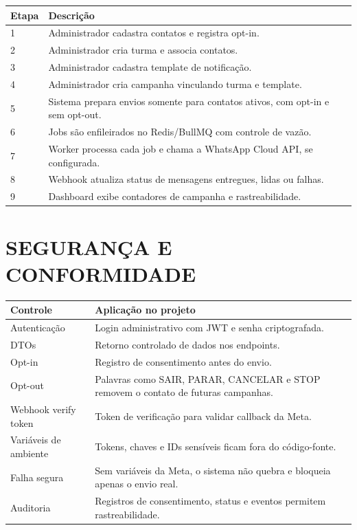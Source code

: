 \documentclass[12pt,letterpaper,oneside]{report}
\begin{document}
\begin{quadro}[H]
\centering
\caption{Fluxo técnico de campanha}
\vspace{0.3cm}
\begin{tabular}{|p{2cm}|p{11cm}|}
\hline
\textbf{Etapa} & \textbf{Descrição}\\
\hline
1 & Administrador cadastra contatos e registra opt-in.\\
\hline
2 & Administrador cria turma e associa contatos.\\
\hline
3 & Administrador cadastra template de notificação.\\
\hline
4 & Administrador cria campanha vinculando turma e template.\\
\hline
5 & Sistema prepara envios somente para contatos ativos, com opt-in e sem opt-out.\\
\hline
6 & Jobs são enfileirados no Redis/BullMQ com controle de vazão.\\
\hline
7 & Worker processa cada job e chama a WhatsApp Cloud API, se configurada.\\
\hline
8 & Webhook atualiza status de mensagens entregues, lidas ou falhas.\\
\hline
9 & Dashboard exibe contadores de campanha e rastreabilidade.\\
\hline
\end{tabular}
\end{quadro}

\section{SEGURANÇA E CONFORMIDADE}

\begin{quadro}[H]
\centering
\caption{Controles de segurança previstos no MVP}
\vspace{0.3cm}
\begin{tabular}{|p{4cm}|p{9cm}|}
\hline
\textbf{Controle} & \textbf{Aplicação no projeto}\\
\hline
Autenticação & Login administrativo com JWT e senha criptografada.\\
\hline
DTOs & Retorno controlado de dados nos endpoints.\\
\hline
Opt-in & Registro de consentimento antes do envio.\\
\hline
Opt-out & Palavras como SAIR, PARAR, CANCELAR e STOP removem o contato de futuras campanhas.\\
\hline
Webhook verify token & Token de verificação para validar callback da Meta.\\
\hline
Variáveis de ambiente & Tokens, chaves e IDs sensíveis ficam fora do código-fonte.\\
\hline
Falha segura & Sem variáveis da Meta, o sistema não quebra e bloqueia apenas o envio real.\\
\hline
Auditoria & Registros de consentimento, status e eventos permitem rastreabilidade.\\
\hline
\end{tabular}
\end{quadro}
\end{document}
